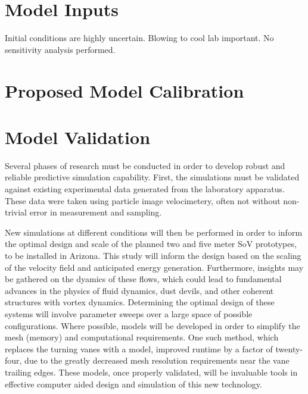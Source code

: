 \documentclass{article}
\begin{document}
%
%
%
\section{Model Inputs}

Initial conditions are highly uncertain. Blowing to cool lab important. 
No sensitivity analysis performed. 

%
%
%
\section{Proposed Model Calibration}


%
%
%
\section{Model Validation}

Several phases of research must be conducted in order to develop robust
and reliable predictive simulation capability. First, the simulations
must be validated against existing experimental data generated from the
laboratory apparatus. These data were taken using particle image
velocimetery, often not without non-trivial error in measurement and
sampling. 

New simulations at different conditions will then be performed in order
to inform the optimal design and scale of the planned two and five meter
SoV prototypes, to be installed in Arizona. This study will inform the
design based on the scaling 
of the velocity field and anticipated energy generation. Furthermore,
insights may be gathered on the dyamics of these flows, which could lead
to fundamental advances in the physics of fluid dynamics, dust devils,
and other coherent structures with vortex
dynamics\cite{Mullen1977181,smithleslie,kanak}. Determining the optimal design of
these systems will involve parameter sweeps over a large space of
possible configurations. Where possible, models will be developed in
order to simplify the mesh (memory) and computational requirements. One
such method, which replaces the turning vanes with a model, improved
runtime by a factor of twenty-four, due to the greatly decreased
mesh resolution requirements near the vane trailing edges. These models,
once properly validated, will be invaluable tools in effective computer
aided design and simulation of this new technology. 
\end{document}
